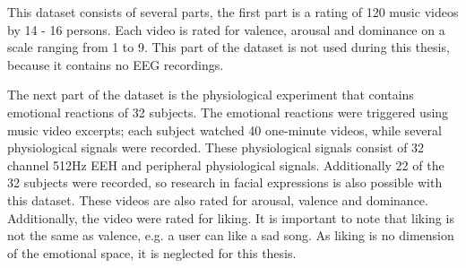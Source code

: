 \npar

This dataset consists of several parts, the first part is a rating of 120 music videos by 14 - 16 persons. Each video is rated for valence, arousal and dominance on a scale ranging from 1 to 9. This part of the dataset is not used during this thesis, because it contains no EEG recordings.

\npar

The next part of the dataset is the physiological experiment that contains emotional reactions of 32 subjects. The emotional reactions were triggered using music video excerpts; each subject watched 40 one-minute videos, while several physiological signals were recorded. These physiological signals consist of 32 channel 512Hz EEH and peripheral physiological signals. Additionally 22 of the 32 subjects were recorded, so research in facial expressions is also possible with this dataset. These videos are also rated for arousal, valence and dominance. Additionally, the video were rated for liking. It is important to note that liking is not the same as valence, e.g. a user can like a sad song. As liking is no dimension of the emotional space, it is neglected for this thesis.

\npar

